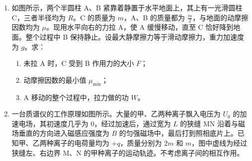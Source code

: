 \documentclass[\gkver]{gaokaozhenti}
\begin{document}
\begin{enumerate}
\item
如图所示，两个半圆柱 A、B 紧靠着静置于水平地面上，其上有一光滑圆柱 C，三者半径均为 $R$。C 的质量为 $m$，A、B 的质量都为 $\frac{m}{2}$，与地面的动摩擦因数均为 $\mu$。现用水平向右的力拉 A，使 A 缓慢移动，直至 C 恰好降到地面。整个过程中 B 保持静止。设最大静摩擦力等于滑动摩擦力，重力加速度为 $g$。求：

\begin{enumerate}
	\item
	未拉 A 时，C 受到 B 作用力的大小 $F$；
	\item
	动摩擦因数的最小值 $\mu_{\min}$；
	\item
	A 移动的整个过程中，拉力做的功 $W$。
\end{enumerate}

\onepicture[align=right, w=7.64cm]{}


\item
一台质谱仪的工作原理如图所示。大量的甲、乙两种离子飘入电压为 $U_{0}$ 的加速电场，其初速度几乎为 0，经过加速后，通过宽为 $L$ 的狭缝 MN 沿着与磁场垂直的方向进入磁感应强度为 $B$ 的匀强磁场中，最后打到照相底片上。已知甲、乙两种离子的电荷量均为 $+q$，质量分别为 $2m$ 和 $m$，图中虚线为经过狭缝左、右边界 M、N 的甲种离子的运动轨迹。不考虑离子间的相互作用。


\end{enumerate}
\end{document}
